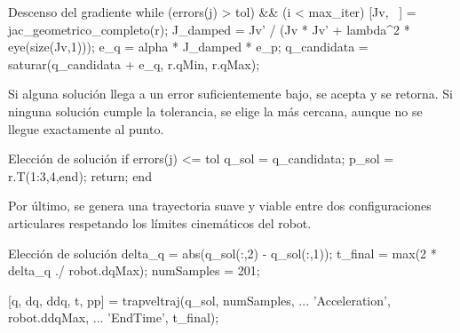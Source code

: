 \begin{matlabcode}{Descenso del gradiente}
	while (errors(j) > tol) && (i < max_iter)
    [Jv, ~] = jac_geometrico_completo(r);
    J_damped = Jv' / (Jv * Jv' + lambda^2 * eye(size(Jv,1)));  %
    e_q = alpha * J_damped * e_p;
    q_candidata = saturar(q_candidata + e_q, r.qMin, r.qMax);
\end{matlabcode}

Si alguna solución llega a un error suficientemente bajo, se acepta y se retorna. Si ninguna solución cumple la tolerancia, se elige la más cercana, aunque no se llegue exactamente al punto.

\begin{matlabcode}{Elección de solución}
	if errors(j) <= tol
        q_sol = q_candidata;
        p_sol = r.T(1:3,4,end);
        return;
    end
\end{matlabcode}

Por último, se genera una trayectoria suave y viable entre dos configuraciones articulares respetando los límites cinemáticos del robot.

\begin{matlabcode}{Elección de solución}
    delta_q = abs(q_sol(:,2) - q_sol(:,1));
    t_final = max(2 * delta_q ./ robot.dqMax);
    numSamples = 201;
    
    [q, dq, ddq, t, pp] = trapveltraj(q_sol, numSamples, ...
                                                'Acceleration', robot.ddqMax, ...
                                                'EndTime', t_final);
\end{matlabcode}